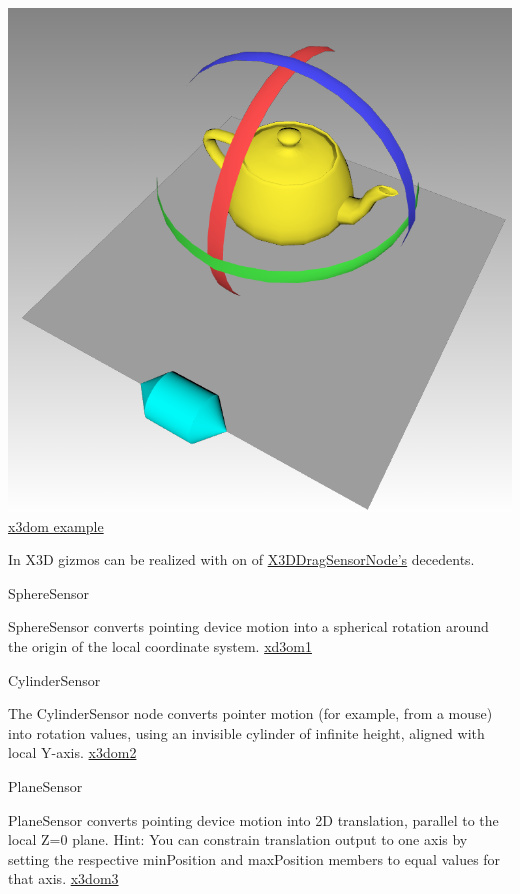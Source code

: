 \includegraphics{../assets/x3dom-gizmo-example.png}\\

\href{http://doc.x3dom.org/tutorials/animationInteraction/transformations/example.html}{x3dom
example}

In X3D gizmos can be realized with on of
\href{http://doc.x3dom.org/author/PointingDeviceSensor/X3DDragSensorNode.html}{X3DDragSensorNode's}
decedents.

\begin{itemize*}
\item
  SphereSensor
\item
  SphereSensor converts pointing device motion into a spherical rotation
  around the origin of the local coordinate system.
  \href{http://doc.x3dom.org/author/PointingDeviceSensor/SphereSensor.html}{xd3om1}
\item
  CylinderSensor
\item
  The CylinderSensor node converts pointer motion (for example, from a
  mouse) into rotation values, using an invisible cylinder of infinite
  height, aligned with local Y-axis.
  \href{http://doc.x3dom.org/author/PointingDeviceSensor/CylinderSensor.html}{x3dom2}
\item
  PlaneSensor
\item
  PlaneSensor converts pointing device motion into 2D translation,
  parallel to the local Z=0 plane. Hint: You can constrain translation
  output to one axis by setting the respective minPosition and
  maxPosition members to equal values for that axis.
  \href{http://doc.x3dom.org/author/PointingDeviceSensor/PlaneSensor.html}{x3dom3}
\end{itemize*}

